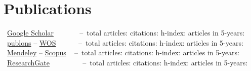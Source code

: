 \documentclass[11pt,a4paper]{moderncv}
\newcommand{\es}[2]{\iftoggle{es}{#1}{#2}}
\newcommand{\short}[2]{\iftoggle{short}{#1}{#2}}
\begin{document}
{  \section{Publications}
    \aiGoogleScholar ~\href{https://scholar.google.es/citations?user=hIl4ixAAAAAJ\&hl}{Google Scholar} ~~~~~~
  --~total articles: \totalGoogle{} citations: \citationGoogle{} h-index: \HindexGoogle{} articles in 5-years: \fiveYearsGoogle{}\\
    \aiPublons ~\href{https://publons.com/researcher/1711633}{publons} -- \href{https://app.webofknowledge.com/author/\#/record/5462071}{WOS} ~~~~~
  --~total articles: \totalWos{} citations: \citationWOS{} h-index: \HindexWOS{} articles in 5-years: \fiveYearsWos{}\\
    \aiMendeley ~\href{https://www.mendeley.com/profiles/carlos-contreras-bolton/}{Mendeley} -- \href{https://www.scopus.com/authid/detail.uri?authorId=55097104500}{Scopus} ~
  --~total articles: \totalScopus{} citations: \citationScopus{} h-index: \HindexScopus{} articles in 5-years: \fiveYearsScopus{}\\
    \aiResearchGate ~\href{https://www.researchgate.net/profile/Carlos\_Contreras\_Bolton}{ResearchGate} ~~~~~~~~
  --~total articles: \totalRG{} citations: \citationRG{} h-index: \HindexRG{} articles in 5-years: \fiveYearsRG{}
}


\short
{
}{
\nociteSometido{*}
\es{\bibliographystyleSometido{spanish}}{\bibliographystyleSometido{english}}
\bibliographySometido{publicacionesSometido}                   %

\nociteRevista{*}
\es{\newpage\bibliographystyleRevista{spanish}}{\bibliographystyleRevista{english}}
\bibliographyRevista{publicacionesRevista}                   %

\nociteLibro{*}
\es{\bibliographystyleLibro{spanish}}{\bibliographystyleLibro{english}}
\bibliographyLibro{publicacionesLibro}

\nociteProceeding{*}
\es{\bibliographystyleProceeding{spanish}}{\bibliographystyleProceeding{english}}
\bibliographyProceeding{publicacionesProceeding}

\nociteConferencia{*}
\es{\bibliographystyleConferencia{spanish}}{\bibliographystyleConferencia{english}}
\bibliographyConferencia{publicacionesConferencia}      %
}
\end{document}
